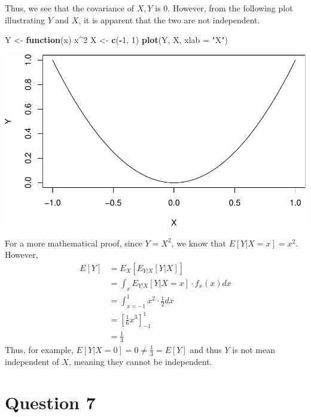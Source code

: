 \documentclass[
]{article}
\newenvironment{Shaded}{\begin{snugshade}}{\end{snugshade}}
\newcommand{\ControlFlowTok}[1]{\textcolor[rgb]{0.13,0.29,0.53}{\textbf{#1}}}
\newcommand{\DataTypeTok}[1]{\textcolor[rgb]{0.13,0.29,0.53}{#1}}
\newcommand{\DecValTok}[1]{\textcolor[rgb]{0.00,0.00,0.81}{#1}}
\newcommand{\KeywordTok}[1]{\textcolor[rgb]{0.13,0.29,0.53}{\textbf{#1}}}
\newcommand{\NormalTok}[1]{#1}
\newcommand{\OperatorTok}[1]{\textcolor[rgb]{0.81,0.36,0.00}{\textbf{#1}}}
\newcommand{\StringTok}[1]{\textcolor[rgb]{0.31,0.60,0.02}{#1}}
\begin{document}
Thus, we see that the covariance of \(X, Y\) is \(0\). However, from the
following plot illustrating \(Y\) and \(X\), it is apparent that the two
are not independent.

\begin{Shaded}
\begin{Highlighting}[]
\NormalTok{Y <-}\StringTok{ }\ControlFlowTok{function}\NormalTok{(x) x}\OperatorTok{^}\DecValTok{2}
\NormalTok{X <-}\StringTok{ }\KeywordTok{c}\NormalTok{(}\OperatorTok{-}\DecValTok{1}\NormalTok{, }\DecValTok{1}\NormalTok{)}
\KeywordTok{plot}\NormalTok{(Y, X, }\DataTypeTok{xlab =} \StringTok{"X"}\NormalTok{)}
\end{Highlighting}
\end{Shaded}

\includegraphics{Pset1_files/figure-latex/unnamed-chunk-6-1.pdf}

For a more mathematical proof, since \(Y = X^2\), we know that
\(E[Y|X = x] = x^2\). However, \[\begin{aligned} 
E[Y] &= E_X[E_{Y|X}[Y|X]] \\
&= \int _x E_{Y|X}[Y|X=x] \cdot f_x(x) dx\\
&= \int _{x = -1} ^{1} x^2 \cdot \frac{1}{2} dx \\
&= [\frac{1}{6}x^3]^1 _ {-1} \\
&= \frac{1}{3}
\end{aligned}\] Thus, for example,
\(E[Y|X=0] = 0 \neq \frac{1}{3} = E[Y]\) and thus \(Y\) is not mean
independent of \(X\), meaning they cannot be independent.

\hypertarget{question-7}{%
\section{Question 7}\label{question-7}}
\end{document}
